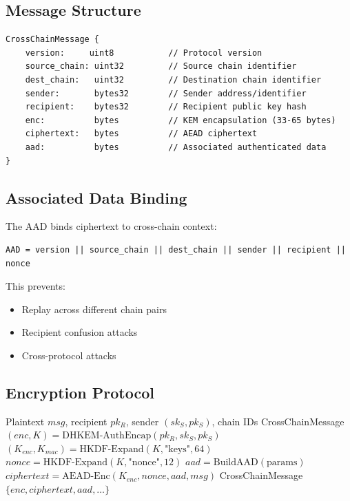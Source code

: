 \documentclass[11pt,a4paper]{article}
\begin{document}
\subsection{Message Structure}

\begin{verbatim}
CrossChainMessage {
    version:     uint8           // Protocol version
    source_chain: uint32         // Source chain identifier
    dest_chain:   uint32         // Destination chain identifier
    sender:       bytes32        // Sender address/identifier
    recipient:    bytes32        // Recipient public key hash
    enc:          bytes          // KEM encapsulation (33-65 bytes)
    ciphertext:   bytes          // AEAD ciphertext
    aad:          bytes          // Associated authenticated data
}
\end{verbatim}

\subsection{Associated Data Binding}

The AAD binds ciphertext to cross-chain context:
\begin{verbatim}
AAD = version || source_chain || dest_chain || sender || recipient || nonce
\end{verbatim}

This prevents:
\begin{itemize}
    \item Replay across different chain pairs
    \item Recipient confusion attacks
    \item Cross-protocol attacks
\end{itemize}

\subsection{Encryption Protocol}

\begin{algorithm}
\caption{EncryptCrossChainMessage}
\begin{algorithmic}[1]
\Require Plaintext $msg$, recipient $pk_R$, sender $(sk_S, pk_S)$, chain IDs
\Ensure CrossChainMessage
\State $(enc, K) = \text{DHKEM-AuthEncap}(pk_R, sk_S, pk_S)$
\State $(K_{enc}, K_{mac}) = \text{HKDF-Expand}(K, \text{"keys"}, 64)$
\State $nonce = \text{HKDF-Expand}(K, \text{"nonce"}, 12)$
\State $aad = \text{BuildAAD}(\text{params})$
\State $ciphertext = \text{AEAD-Enc}(K_{enc}, nonce, aad, msg)$
\State \Return CrossChainMessage$\{enc, ciphertext, aad, \ldots\}$
\end{algorithmic}
\end{algorithm}
\end{document}
